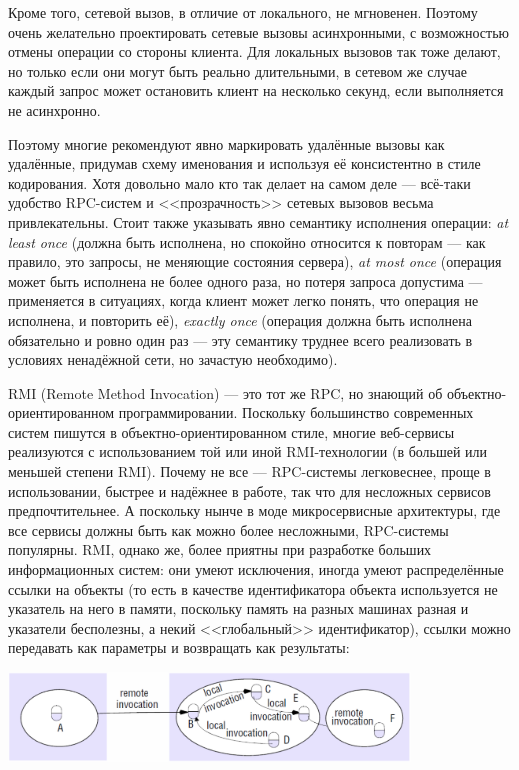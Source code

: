 \documentclass[a5paper]{article}
\begin{document}
Кроме того, сетевой вызов, в отличие от локального, не мгновенен. Поэтому очень желательно проектировать сетевые вызовы асинхронными, с возможностью отмены операции со стороны клиента. Для локальных вызовов так тоже делают, но только если они могут быть реально длительными, в сетевом же случае каждый запрос может остановить клиент на несколько секунд, если выполняется не асинхронно.

Поэтому многие рекомендуют явно маркировать удалённые вызовы как удалённые, придумав схему именования и используя её консистентно в стиле кодирования. Хотя довольно мало кто так делает на самом деле --- всё-таки удобство RPC-систем и <<прозрачность>> сетевых вызовов весьма привлекательны. Стоит также указывать явно семантику исполнения операции: \emph{at least once} (должна быть исполнена, но спокойно относится к повторам --- как правило, это запросы, не меняющие состояния сервера), \emph{at most once} (операция может быть исполнена не более одного раза, но потеря запроса допустима --- применяется в ситуациях, когда клиент может легко понять, что операция не исполнена, и повторить её), \emph{exactly once} (операция должна быть исполнена обязательно и ровно один раз --- эту семантику труднее всего реализовать в условиях ненадёжной сети, но зачастую необходимо).

RMI (Remote Method Invocation) --- это тот же RPC, но знающий об объектно-ориентированном программировании. Поскольку большинство современных систем пишутся в объектно-ориентированном стиле, многие веб-сервисы реализуются с использованием той или иной RMI-технологии (в большей или меньшей степени RMI). Почему не все --- RPC-системы легковеснее, проще в использовании, быстрее и надёжнее в работе, так что для несложных сервисов предпочтительнее. А поскольку нынче в моде микросервисные архитектуры, где все сервисы должны быть как можно более несложными, RPC-системы популярны. RMI, однако же, более приятны при разработке больших информационных систем: они умеют исключения, иногда умеют распределённые ссылки на объекты (то есть в качестве идентификатора объекта используется не указатель на него в памяти, поскольку память на разных машинах разная и указатели бесполезны, а некий <<глобальный>> идентификатор), ссылки можно передавать как параметры и возвращать как результаты:

\begin{center}
    \includegraphics[width=0.8\textwidth]{remoteCalls.png}
\end{center}
\end{document}

